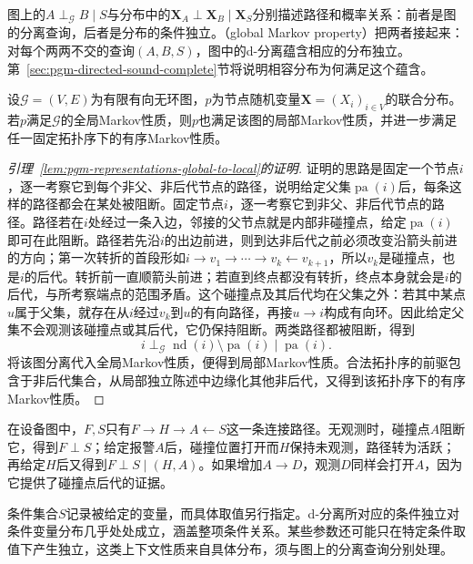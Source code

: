 图上的$A\perp_{\mathcal G}B\mid S$与分布中的$\bm{X}_A\perp\bm{X}_B\mid\bm{X}_S$分别描述路径和概率关系：前者是图的分离查询，后者是分布的条件独立。（global Markov property）把两者接起来：对每个两两不交的查询$(A,B,S)$，图中的d-分离蕴含相应的分布独立。第~\ref{sec:pgm-directed-sound-complete}节将说明相容分布为何满足这个蕴含。

\begin{lemma}[全局Markov性质蕴含局部Markov性质]
  \label{lem:pgm-representations-global-to-local}
  设$\mathcal{G}=(V,E)$为有限有向无环图，$p$为节点随机变量$\bm{X}=(X_i)_{i\in V}$的联合分布。若$p$满足$\mathcal{G}$的全局Markov性质，则$p$也满足该图的局部Markov性质，并进一步满足任一固定拓扑序下的有序Markov性质。
\end{lemma}

\begin{proof}[引理~\ref{lem:pgm-representations-global-to-local}的证明]
证明的思路是固定一个节点$i$，逐一考察它到每个非父、非后代节点的路径，说明给定父集$\operatorname{pa}(i)$后，每条这样的路径都会在某处被阻断。固定节点$i$，逐一考察它到非父、非后代节点的路径。路径若在$i$处经过一条入边，邻接的父节点就是内部非碰撞点，给定$\operatorname{pa}(i)$即可在此阻断。路径若先沿$i$的出边前进，则到达非后代之前必须改变沿箭头前进的方向；第一次转折的首段形如$i\to v_1\to\cdots\to v_k\leftarrow v_{k+1}$，所以$v_k$是碰撞点，也是$i$的后代。转折前一直顺箭头前进；若直到终点都没有转折，终点本身就会是$i$的后代，与所考察端点的范围矛盾。这个碰撞点及其后代均在父集之外：若其中某点$u$属于父集，就存在从$i$经过$v_k$到$u$的有向路径，再接$u\to i$构成有向环。因此给定父集不会观测该碰撞点或其后代，它仍保持阻断。两类路径都被阻断，得到
\[
  i\perp_{\mathcal G}
  \operatorname{nd}(i)\setminus\operatorname{pa}(i)
  \mid\operatorname{pa}(i).
\]
将该图分离代入全局Markov性质，便得到局部Markov性质。合法拓扑序的前驱包含于非后代集合，从局部独立陈述中边缘化其他非后代，又得到该拓扑序下的有序Markov性质。
\end{proof}

在设备图中，$F,S$只有$F\to H\to A\leftarrow S$这一条连接路径。无观测时，碰撞点$A$阻断它，得到$F\perp S$；给定报警$A$后，碰撞位置打开而$H$保持未观测，路径转为活跃；再给定$H$后又得到$F\perp S\mid(H,A)$。如果增加$A\to D$，观测$D$同样会打开$A$，因为它提供了碰撞点后代的证据。

条件集合$S$记录被给定的变量，而具体取值另行指定。d-分离所对应的条件独立对条件变量分布几乎处处成立，涵盖整项条件关系。某些参数还可能只在特定条件取值下产生独立，这类上下文性质来自具体分布，须与图上的分离查询分别处理。

